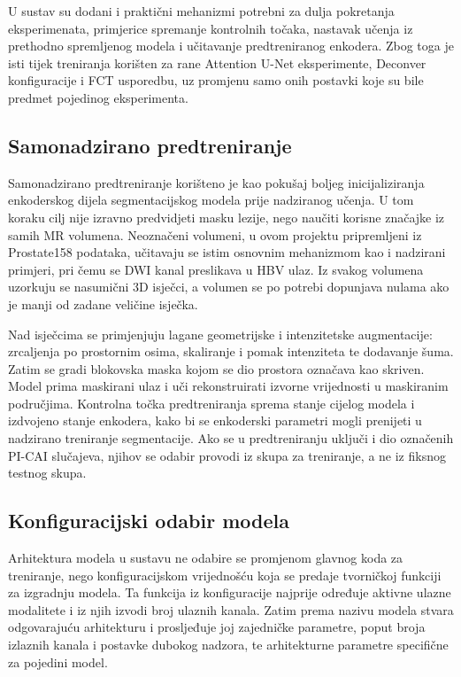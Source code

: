\documentclass[a4paper,12pt,oneside]{article}
\begin{document}
U sustav su dodani i praktični mehanizmi potrebni za dulja pokretanja eksperimenata, primjerice spremanje kontrolnih točaka, nastavak učenja iz prethodno spremljenog modela i učitavanje predtreniranog enkodera. Zbog toga je isti tijek treniranja korišten za rane Attention U-Net eksperimente, Deconver konfiguracije i FCT usporedbu, uz promjenu samo onih postavki koje su bile predmet pojedinog eksperimenta.

\subsection{Samonadzirano predtreniranje}

Samonadzirano predtreniranje korišteno je kao pokušaj boljeg inicijaliziranja enkoderskog dijela segmentacijskog modela prije nadziranog učenja. U tom koraku cilj nije izravno predvidjeti masku lezije, nego naučiti korisne značajke iz samih MR volumena. Neoznačeni volumeni, u ovom projektu pripremljeni iz Prostate158 podataka, učitavaju se istim osnovnim mehanizmom kao i nadzirani primjeri, pri čemu se DWI kanal preslikava u HBV ulaz. Iz svakog volumena uzorkuju se nasumični 3D isječci, a volumen se po potrebi dopunjava nulama ako je manji od zadane veličine isječka.

Nad isječcima se primjenjuju lagane geometrijske i intenzitetske augmentacije: zrcaljenja po prostornim osima, skaliranje i pomak intenziteta te dodavanje šuma. Zatim se gradi blokovska maska kojom se dio prostora označava kao skriven. Model prima maskirani ulaz i uči rekonstruirati izvorne vrijednosti u maskiranim područjima. Kontrolna točka predtreniranja sprema stanje cijelog modela i izdvojeno stanje enkodera, kako bi se enkoderski parametri mogli prenijeti u nadzirano treniranje segmentacije. Ako se u predtreniranju uključi i dio označenih PI-CAI slučajeva, njihov se odabir provodi iz skupa za treniranje, a ne iz fiksnog testnog skupa.

\subsection{Konfiguracijski odabir modela}

Arhitektura modela u sustavu ne odabire se promjenom glavnog koda za treniranje, nego konfiguracijskom vrijednošću koja se predaje tvorničkoj funkciji za izgradnju modela. Ta funkcija iz konfiguracije najprije određuje aktivne ulazne modalitete i iz njih izvodi broj ulaznih kanala. Zatim prema nazivu modela stvara odgovarajuću arhitekturu i prosljeđuje joj zajedničke parametre, poput broja izlaznih kanala i postavke dubokog nadzora, te arhitekturne parametre specifične za pojedini model.
\end{document}
